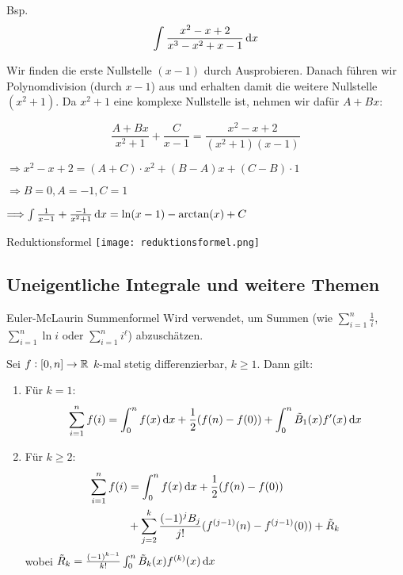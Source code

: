 \begin{example}
    Bsp.
    $$\int \frac{x^{2}-x+2}{x^{3}-x^{2}+x-1} \dif x$$

    Wir finden die erste Nullstelle $(x-1)$ durch Ausprobieren. Danach führen wir Polynomdivision (durch $x-1$) aus und erhalten damit die weitere Nullstelle $(x^{2}+1)$. Da $x^{2}+1$ eine komplexe Nullstelle ist, nehmen wir dafür $A+B x$:

    $$\frac{A+B x}{x^{2}+1}+\frac{C}{x-1}=\frac{x^{2}-x+2}{(x^{2}+1)(x-1)}$$

    $\Longrightarrow x^{2}-x+2=(A+C) \cdot x^{2}+(B-A) x+(C-B) \cdot 1$

    $\Longrightarrow B=0, A=-1, C=1$

    $\Longrightarrow \int \frac{1}{x-1}+\frac{-1}{x^{2}+1} \dif x=\ln (x-1)-\arctan (x)+C$
\end{example}

\begin{corollary}{Reduktionsformel}
    \texttt{[image: reduktionsformel.png]}
\end{corollary}

\subsection{Uneigentliche Integrale und weitere Themen}

\begin{theorem}[important]{Euler-McLaurin Summenformel}
    Wird verwendet, um Summen (wie $\sum_{i=1}^n \frac{1}{i}$, $\sum_{i=1}^n \ln{i}$ oder $\sum_{i=1}^n i^\ell$) abzuschätzen.

    Sei $f : [0,n] \to \mathbb{R}$ $k$-mal stetig differenzierbar, $k \geq 1$.
    Dann gilt:
    \begin{enumerate}
        \item Für $k=1$:
        \begin{equation}
            \sum^{n}_{i=1} f(i) = \int_{0}^{n} f(x) \dif x + \frac{1}{2} ( f(n) - f(0) ) + \int_{0}^{n} \tilde{B}_1 (x) f'(x) \dif x
        \end{equation}
        \item Für $k \geq 2$:
        \begin{align}
            \sum^{n}_{i=1} f(i) &= \int_{0}^{n} f(x) \dif x + \frac{1}{2} ( f(n) - f(0) )\\
            &+ \sum^{k}_{j=2} \frac{(-1)^j B_j}{j!} ( f^{(j-1)} (n) - f^{(j-1)} (0) ) + \tilde{R}_k
        \end{align}
        wobei $\tilde{R}_k = \frac{(-1)^{k-1}}{k!} \int_{0}^{n} \tilde{B}_k (x) f^{(k)} (x) \dif x$
    \end{enumerate}
\end{theorem}

